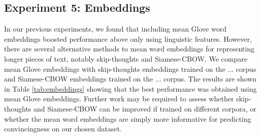 \subsection{Experiment 5: Embeddings}

In our previous experiments, we found that including mean Glove word embeddings boosted performance above only using linguistic features. However, there are several alternative methods to mean word embeddings for representing longer pieces of text, 
notably skip-thoughts\cite{skipthoughts} and Siamese-CBOW\cite{siamesecbow}.
We compare mean Glove embeddings with skip-thoughts embeddings trained on the ... corpus\cite{skipthoughts_embeddings} and Siamese-CBOW embeddings trained on the ...
corpus\cite{siamesecbow_embeddings}. 
The results are shown in Table \ref{tab:embeddings} showing that the best performance
was obtained using mean Glove embeddings. 
Further work may be required to assess whether skip-thoughts and Siamese-CBOW 
can be improved if trained on different corpora, or whether the mean word embeddings
are simply more informative for predicting convincingness on our chosen dataset.
